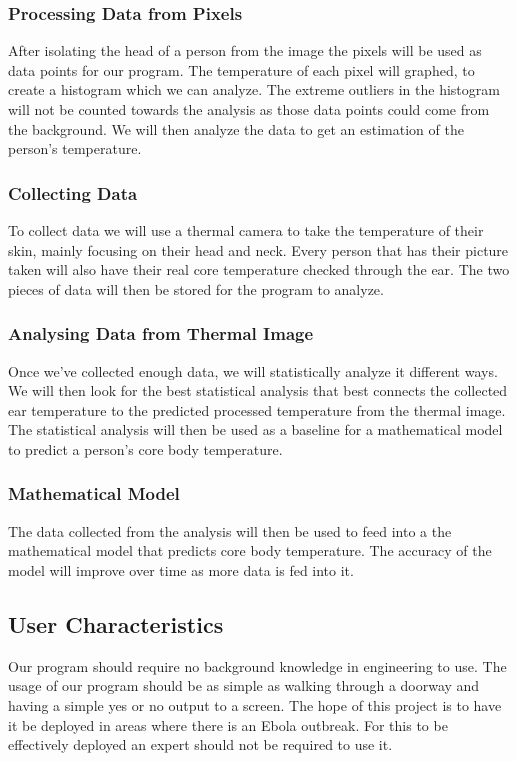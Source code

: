 \documentclass[onecolumn, draftclsnofoot,10pt, compsoc]{IEEEtran}
\begin{document}
		\subsubsection{Processing Data from Pixels}
		After isolating the head of a person from the image the pixels will be used as data points for our program. The temperature of each pixel will graphed, to create a histogram which we can analyze. The extreme outliers in the histogram will not be counted towards the analysis as those data points could come from the background. We will then analyze the data to get an estimation of the person’s temperature.
		\subsubsection{Collecting Data}
		To collect data we will use a thermal camera to take the temperature of their skin, mainly focusing on their head and neck. Every person that has their picture taken will also have their real core temperature checked through the ear. The two pieces of data will then be stored for the program to analyze.
		\subsubsection{Analysing Data from Thermal Image}
		Once we’ve collected enough data, we will statistically analyze it different ways. We will then look for the best statistical analysis that best connects the collected ear temperature to the predicted processed temperature from the thermal image. The statistical analysis will then be used as a baseline for a mathematical model to predict a person’s core body temperature.
		\subsubsection{Mathematical Model}
		The data collected from the analysis will then be used to feed into a the mathematical model that predicts core body temperature. The accuracy of the model will improve over time as more data is fed into it.
	\subsection{User Characteristics}
	Our program should require no background knowledge in engineering to use. The usage of our program should be as simple as walking through a doorway and having a simple yes or no output to a screen. The hope of this project is to have it be deployed in areas where there is an Ebola outbreak. For this to be effectively deployed an expert should not be required to use it.
\end{document}
